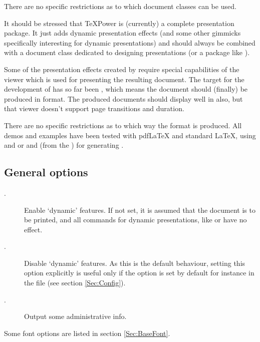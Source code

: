 \documentclass[12pt]{scrartcl}
\let\newslide=\relax
\begin{document}
There are no specific restrictions as to which document classes can be used.

It should be stressed that \TeX Power is  (currently) a complete presentation package. It just adds dynamic
presentation effects (and some other gimmicks specifically interesting for dynamic presentations) and should always be
combined with a document class dedicated to designing presentations (or a package like
\href{ftp://ftp.dante.de/tex-archive/help/Catalogue/entries/pdfslide.html}{}).

Some of the presentation effects created by  require special capabilities of the viewer which is used for
presenting the resulting document. The target for the development of  has so far been
\href{http://www.adobe.com/products/acrobat/readermain.html}%
{}, which means the
document should (finally) be produced in  format. The produced
 documents should display well in
\href{http://www.cs.wisc.edu/~ghost/gsview/}{} also, but that
viewer doesn't support page transitions and duration.

There are no specific restrictions as to which way the  format is produced. All demos and examples
have been tested with pdf\LaTeX{} and standard \LaTeX, using
 and \href{http://www.adobe.com/products/acrobat/}%
{}
or  and  (from the \href{http://www.ghostscript.com/}%
{}) for generating .

\newslide

\subsection{General options}\label{Sec:GenOpt}
\begin{description}
\item[.] Enable `dynamic' features. If not set, it is assumed that the document is to be
  printed, and all commands for dynamic presentations, like  or  have no effect.

\item[.] Disable `dynamic' features. As this is the default behaviour,
  setting this option explicitly is useful only if the option  is set by default for instance in the
   file (see section \ref{Sec:Config}).

\item[.] Output some administrative info.
\end{description}
Some font options are listed in section \ref{Sec:BaseFont}.
\end{document}
